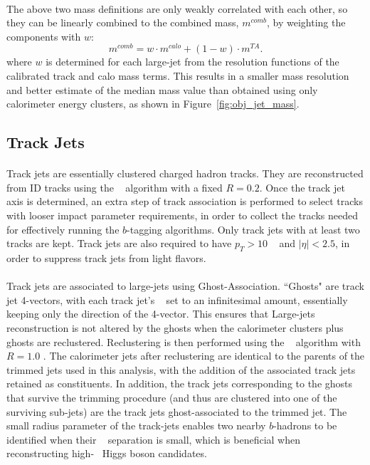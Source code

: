 \paragraph{}
The above two mass definitions are only weakly correlated with each other, so they can be linearly combined to the combined mass, $m^{comb}$, by weighting the components with $w$:
\begin{equation}
m^{comb} = w\cdot m^{calo}+(1-w)\cdot m^{TA}.
\end{equation}
where $w$ is determined for each large-\R jet from the resolution functions of the calibrated track and calo mass terms.
This results in a smaller mass resolution and better estimate of the median mass value than obtained using only calorimeter energy clusters, as shown in Figure~\ref{fig:obj_jet_mass}.

\subsection{Track Jets}
\paragraph{}
Track jets are essentially clustered charged hadron tracks. 
They are reconstructed from ID tracks using the \akt~ algorithm with a fixed $R=0.2$. 
Once the track jet axis is determined, an extra step of track association is performed to select tracks with looser impact parameter requirements, in order to collect the tracks needed for effectively running the $b$-tagging algorithms.
Only track jets with at least two tracks are kept.
Track jets are also required to have $p_T > 10$ \GeV~ and $|\eta| < 2.5$, in order to suppress track jets from light flavors.

\paragraph{}
Track jets are associated to large-\R jets using Ghost-Association.
``Ghosts" are track jet 4-vectors, with each track jet's \pt~ set to an infinitesimal amount, essentially keeping only the direction of the 4-vector.
This ensures that Large-\R jets reconstruction is not altered by the ghosts when the calorimeter clusters plus ghosts are reclustered.
Reclustering is then performed using the \akt~ algorithm with $R=1.0$ .
The calorimeter jets after reclustering are identical to the parents of the trimmed jets used in this analysis, with the addition of the associated track jets retained as constituents.
In addition, the track jets corresponding to the ghosts that survive the trimming procedure (and thus are clustered into one of the surviving sub-jets) are the track jets ghost-associated to the trimmed jet.
The small radius parameter of the track-jets enables two nearby $b$-hadrons to be identified when their \DR~ separation is small, which is beneficial when reconstructing high-\pt~ Higgs boson candidates.

